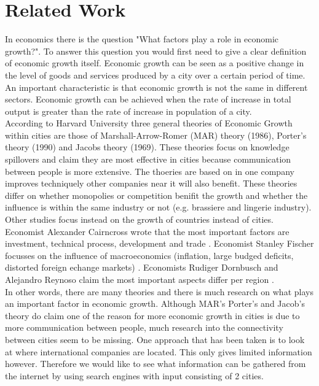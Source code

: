 \section{Related Work}

In economics there is the question "What factors play a role in economic growth?". To answer this question you would first need to give a clear definition of economic growth itself. Economic growth can be seen as a positive change in the level of goods and services produced by a city over a certain period of time. An important characteristic is that economic growth is not the same in different sectors. Economic growth can be achieved when the rate of increase in total output is greater than the rate of increase in population of a city. \\

According to Harvard University three general theories of Economic Growth within cities \cite{glaeser1992growth} are those of Marshall-Arrow-Romer (MAR) theory (1986), Porter's theory (1990) and Jacobs theory (1969). These theories focus on knowledge spillovers and claim they are most effective in cities because communication between people is more extensive. The thoeries are based on in one company improves techniquely other companies near it will also benefit. These theories differ on whether monopolies or competition benifit the growth and whether the influence is within the same industry or not (e.g. brassiere and lingerie industry). \\
Other studies focus instead on the growth of countries instead of cities. Economist Alexander Cairncross wrote that the most important factors are investment, technical process, development and trade \cite{cairncross2013factors}. Economist Stanley Fischer focusses on the influence of macroeconomics (inflation, large budged deficits, distorted foreign echange markets) \cite{fischer1993role}. Economists Rudiger Dornbusch and Alejandro Reynoso claim the most important aspects differ per region \cite{dornbusch1989financial}. \\
In other words, there are many theories and there is much research on what plays an important factor in economic growth. Although MAR's Porter's and Jacob's theory do claim one of the reason for more economic growth in cities is due to more communication between people, much research into the connectivity between cities seem to be missing. One approach that has been taken is to look at where international companies are located. This only gives limited information however. Therefore we would like to see what information can be gathered from the internet by using search engines with input consisting of 2 cities.